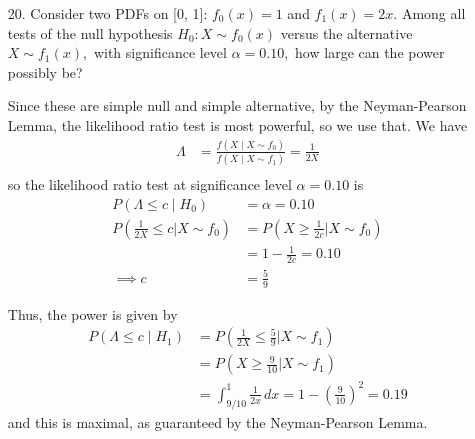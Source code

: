 \documentclass{article}
\begin{document}
\begin{itemize}
	\item[20.] Consider two PDFs on [0, 1]: $f_0(x)=1$ and $f_1(x)=2x.$ Among all tests of the null hypothesis $H_0:X\sim f_0(x)$ versus the alternative $X\sim f_1(x),$ with significance level $\alpha=0.10,$ how large can the power possibly be?
		\begin{soln}
			Since these are simple null and simple alternative, by the Neyman-Pearson Lemma, the likelihood ratio test is most powerful, so we use that. We have
			\begin{align*}
				\Lambda &= \frac{f(X\mid X\sim f_0)}{f(X\mid X\sim f_1)} = \frac{1}{2X} \\
			\end{align*}
			so the likelihood ratio test at significance level $\alpha=0.10$ is 
			\begin{align*}
				P(\Lambda\le c\mid H_0) &= \alpha=0.10 \\
				P\left( \frac{1}{2X} \le c \bigg\vert X\sim f_0 \right) &= P\left( X\ge \frac{1}{2c}\bigg\vert X\sim f_0 \right) \\
				&= 1-\frac{1}{2c} = 0.10 \\
				\implies c &= \frac{5}{9}
			\end{align*}

			Thus, the power is given by
			\begin{align*}
				P(\Lambda\le c\mid H_1) &= P\left( \frac{1}{2X}\le \frac{5}{9}\bigg\vert X\sim f_1 \right) \\
				&= P\left(X\ge \frac{9}{10} \bigg\vert X\sim f_1\right) \\
				&= \int_{9/10}^1 \frac{1}{2x} \, dx = 1-\left( \frac{9}{10} \right)^2 = 0.19
			\end{align*}
			and this is maximal, as guaranteed by the Neyman-Pearson Lemma.

		\end{soln}


\end{itemize}
\end{document}
